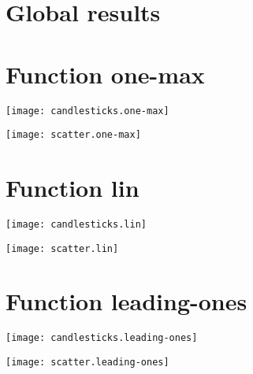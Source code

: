 \graphicspath{{../graphics/}}
\section{Global results}
\begin{center}

\end{center}
\newpage
\section{Function one-max}
\begin{center}

\end{center}
\begin{center}
\texttt{[image: candlesticks.one-max]}
\end{center}
\begin{center}
\texttt{[image: scatter.one-max]}
\end{center}
\begin{center}

\end{center}
\newpage
\section{Function lin}
\begin{center}

\end{center}
\begin{center}
\texttt{[image: candlesticks.lin]}
\end{center}
\begin{center}
\texttt{[image: scatter.lin]}
\end{center}
\begin{center}

\end{center}
\newpage
\section{Function leading-ones}
\begin{center}

\end{center}
\begin{center}
\texttt{[image: candlesticks.leading-ones]}
\end{center}
\begin{center}
\texttt{[image: scatter.leading-ones]}
\end{center}
\begin{center}

\end{center}
\newpage
